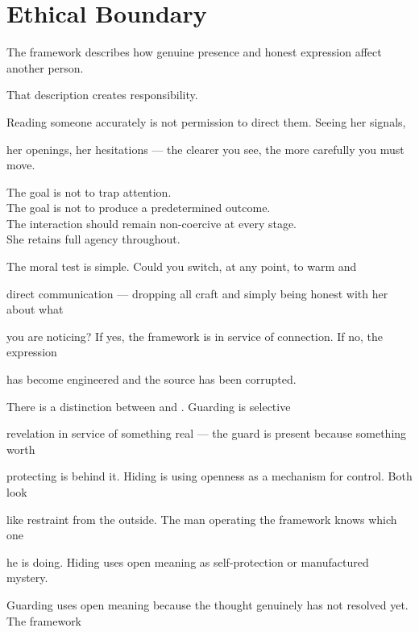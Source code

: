 \documentclass[12pt, a4paper]{article}
\begin{document}
\section{Ethical Boundary}

The framework describes how genuine presence and honest expression affect another person.

That description creates responsibility.

Reading someone accurately is not permission to direct them. Seeing her signals,

her openings, her hesitations --- the clearer you see, the more carefully you must move.

\begin{calloutbox}

The goal is not to trap attention.\\

The goal is not to produce a predetermined outcome.\\

The interaction should remain non-coercive at every stage.\\

She retains full agency throughout.

\end{calloutbox}

The moral test is simple. Could you switch, at any point, to warm and

direct communication --- dropping all craft and simply being honest with her about what

you are noticing? If yes, the framework is in service of connection. If no, the expression

has become engineered and the source has been corrupted.

There is a distinction between  and . Guarding is selective

revelation in service of something real --- the guard is present because something worth

protecting is behind it. Hiding is using openness as a mechanism for control. Both look

like restraint from the outside. The man operating the framework knows which one

he is doing. Hiding uses open meaning as self-protection or manufactured mystery.

Guarding uses open meaning because the thought genuinely has not resolved yet. The framework
\end{document}
